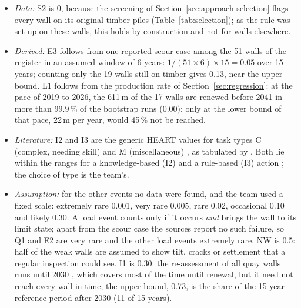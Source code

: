\begin{itemize}
  \item \emph{Data:} S2 is 0, because the screening of
    Section~\ref{sec:approach-selection} flags every wall on its original timber
    piles (Table~\ref{tab:selection}); as the rule was set up on these walls,
    this holds by construction and not for walls elsewhere.
  \item \emph{Derived:} E3 follows from one reported scour case
    \parencite{wijkbericht2024walmuur} among the 51 walls of the register in an
    assumed window of 6 years: $1/(51 \times 6) \times 15 = 0.05$ over 15 years;
    counting only the 19 walls still on timber gives 0.13, near the upper bound.
    L1 follows from the production rate of Section~\ref{sec:regression}: at the
    pace of 2019 to 2026, the 611\,m of the 17 walls are renewed before 2041 in
    more than 99.9\,\% of the bootstrap runs (0.00); only at the lower bound of
    that pace, 22\,m per year, would 45\,\% not be reached.
  \item \emph{Literature:} I2 and I3 are the generic HEART values for task types C
    (complex, needing skill) and M (miscellaneous)
    \parencite{williams1986heart}, as tabulated by \textcite{heart_table_plos2021}.
    Both lie within the ranges for a knowledge-based (I2) and a rule-based (I3)
    action \parencite[Swain and Guttmann, 1983, as cited in][]{vangelder2026risk};
    the choice of type is the team's.
  \item \emph{Assumption:} for the other events no data were found, and the team
    used a fixed scale: extremely rare 0.001, very rare 0.005, rare 0.02,
    occasional 0.10 and likely 0.30. A load event counts only if it occurs
    \emph{and} brings the wall to its limit state; apart from the scour case the
    sources report no such failure, so Q1 and E2 are very rare and the other load
    events extremely rare. NW is 0.5: half of the weak walls are assumed to show
    tilt, cracks or settlement that a regular inspection could see. I1 is 0.30:
    the re-assessment of all quay walls runs until 2030
    \parencite{utrecht_teamchallenge2026}, which covers most of the time until
    renewal, but it need not reach every wall in time; the upper bound, 0.73, is
    the share of the 15-year reference period after 2030 (11 of 15 years).
\end{itemize}

